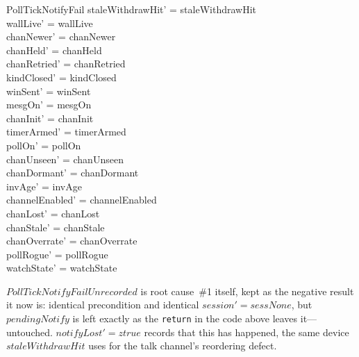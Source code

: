 \documentclass[a4paper,10pt,fleqn]{article}
\begin{document}
\begin{schema}{PollTickNotifyFail}
  staleWithdrawHit' = staleWithdrawHit \\
  wallLive' = wallLive \\
  chanNewer' = chanNewer \\
  chanHeld' = chanHeld \\
  chanRetried' = chanRetried \\
  kindClosed' = kindClosed \\
  winSent' = winSent \\
  mesgOn' = mesgOn \\
  chanInit' = chanInit \\
  timerArmed' = timerArmed \\
  pollOn' = pollOn \\
  chanUnseen' = chanUnseen \\
  chanDormant' = chanDormant \\
  invAge' = invAge \\
  channelEnabled' = channelEnabled \\
  chanLost' = chanLost \\
  chanStale' = chanStale \\
  chanOverrate' = chanOverrate \\
  pollRogue' = pollRogue \\
  watchState' = watchState
\end{schema}

$PollTickNotifyFailUnrecorded$ is root cause~\#1 itself, kept as the
negative result it now is: identical precondition and identical
$session' = sessNone$, but $pendingNotify$ is left exactly as the
\texttt{return} in the code above leaves it---untouched.
$notifyLost' = ztrue$ records that this has happened, the same device
$staleWithdrawHit$ uses for the talk channel's reordering defect.
\end{document}
